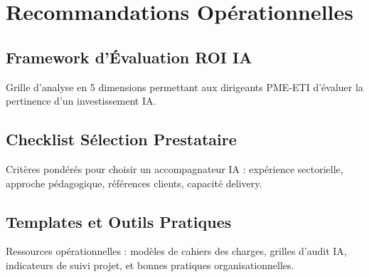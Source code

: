 \chapter{Recommandations Opérationnelles}
\label{app:recommandations}

\section{Framework d'Évaluation ROI IA}
Grille d'analyse en 5 dimensions permettant aux dirigeants PME-ETI d'évaluer la pertinence d'un investissement IA.

\section{Checklist Sélection Prestataire}
Critères pondérés pour choisir un accompagnateur IA : expérience sectorielle, approche pédagogique, références clients, capacité delivery.

\section{Templates et Outils Pratiques}
Ressources opérationnelles : modèles de cahiers des charges, grilles d'audit IA, indicateurs de suivi projet, et bonnes pratiques organisationnelles.
